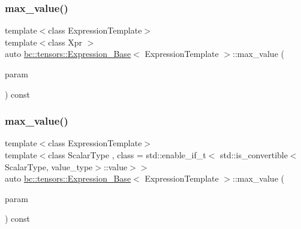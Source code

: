 \subsubsection{\texorpdfstring{max\+\_\+value()}{max\_value()}\hspace{0.1cm}{\footnotesize\ttfamily [1/2]}}
{\footnotesize\ttfamily template$<$class Expression\+Template$>$ \\
template$<$class Xpr $>$ \\
auto \hyperlink{classbc_1_1tensors_1_1Expression__Base}{bc\+::tensors\+::\+Expression\+\_\+\+Base}$<$ Expression\+Template $>$\+::max\+\_\+value (\begin{DoxyParamCaption}\item[{const \hyperlink{classbc_1_1tensors_1_1Expression__Base}{Expression\+\_\+\+Base}$<$ Xpr $>$ \&}]{param }\end{DoxyParamCaption}) const\hspace{0.3cm}{\ttfamily [inline]}}

\mbox{\label{classbc_1_1tensors_1_1Expression__Base_a8e5cab713b7b12c9988a1e1f52e127c1}} 
\subsubsection{\texorpdfstring{max\+\_\+value()}{max\_value()}\hspace{0.1cm}{\footnotesize\ttfamily [2/2]}}
{\footnotesize\ttfamily template$<$class Expression\+Template$>$ \\
template$<$class Scalar\+Type , class  = std\+::enable\+\_\+if\+\_\+t$<$   std\+::is\+\_\+convertible$<$\+Scalar\+Type, value\+\_\+type$>$\+::value$>$$>$ \\
auto \hyperlink{classbc_1_1tensors_1_1Expression__Base}{bc\+::tensors\+::\+Expression\+\_\+\+Base}$<$ Expression\+Template $>$\+::max\+\_\+value (\begin{DoxyParamCaption}\item[{const Scalar\+Type \&}]{param }\end{DoxyParamCaption}) const\hspace{0.3cm}{\ttfamily [inline]}}

\mbox{\label{classbc_1_1tensors_1_1Expression__Base_afd86e2e5c075edbe37958a1c10273b2e}} 

